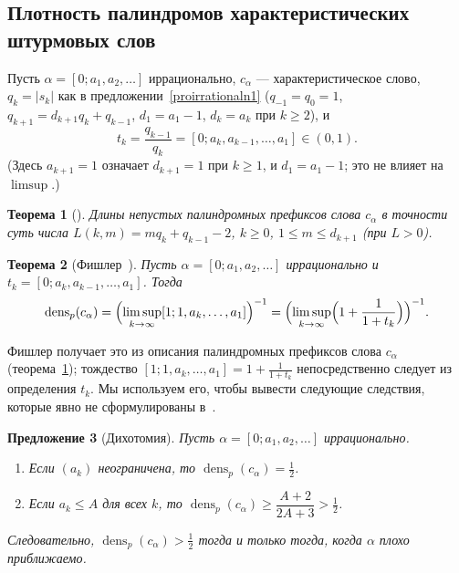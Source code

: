 \documentclass[a4paper,14pt]{extreport}
\theoremstyle{plain}
\newtheorem{theorem}{Теорема}[section]
\newtheorem{proposition}[theorem]{Предложение}
\theoremstyle{definition}
\theoremstyle{remark}
\begin{document}
\subsection{Плотность палиндромов характеристических штурмовых слов}\label{sec:palSturm}

Пусть $\alpha=[0;a_1,a_2,\dots]$ иррационально, $c_\alpha$ --- характеристическое слово, $q_k=|s_k|$ как в
предложении~\ref{proirrationaln1} ($q_{-1}=q_0=1$, $q_{k+1}=d_{k+1}q_k+q_{k-1}$, $d_1=a_1-1$, $d_k=a_k$ при $k\ge2$), и
\begin{equation}
	t_k=\frac{q_{k-1}}{q_k}=[0;a_k,a_{k-1},\dots,a_1]\in(0,1).
\end{equation}
(Здесь $a_{k+1}=1$ означает $d_{k+1}=1$ при $k\ge1$, и $d_1=a_1-1$; это не влияет на $\limsup$.)

\begin{theorem}[\cite{DeLuca1997,Droubay,Fischler}]\label{ct:palprefSturm}
	Длины непустых палиндромных префиксов слова $c_\alpha$ в точности суть числа
	$L(k,m)=mq_k+q_{k-1}-2$, $k\ge0$, $1\le m\le d_{k+1}$ (при $L>0$).
\end{theorem}

\begin{theorem}[{Фишлер~\cite[формула~(1), разд.~3.1]{Fischler}}]\label{thm:palSturm}
	Пусть $\alpha=[0;a_1,a_2,\dots]$ иррационально и $t_k=[0;a_k,a_{k-1},\dots,a_1]$. Тогда
	\begin{equation}
		\operatorname{dens}_p(c_\alpha)=\Bigl(\limsup_{k\to\infty}[1;1,a_k,\dots,a_1]\Bigr)^{-1}
		=\Bigl(\limsup_{k\to\infty}\Bigl(1+\frac1{1+t_k}\Bigr)\Bigr)^{-1}.
	\end{equation}
\end{theorem}

\noindent Фишлер получает это из описания палиндромных префиксов слова $c_\alpha$ (теорема~\ref{ct:palprefSturm}); тождество $[1;1,a_k,\dots,a_1]=1+\frac1{1+t_k}$ непосредственно следует из определения $t_k$. Мы используем его, чтобы вывести следующие следствия, которые явно не сформулированы в~\cite{Fischler}.

\begin{proposition}[Дихотомия]\label{prop:dichotomy}
	Пусть $\alpha=[0;a_1,a_2,\dots]$ иррационально.
	\begin{enumerate}
		\item Если $(a_k)$ неограничена, то $\operatorname{dens}_p(c_\alpha)=\tfrac12$.
		\item Если $a_k\le A$ для всех $k$, то $\operatorname{dens}_p(c_\alpha)\ge\dfrac{A+2}{2A+3}>\tfrac12$.
	\end{enumerate}
	Следовательно, $\operatorname{dens}_p(c_\alpha)>\tfrac12$ тогда и только тогда, когда $\alpha$ плохо приближаемо.
\end{proposition}
\end{document}
